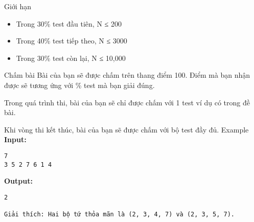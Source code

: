 Giới hạn
\begin{itemize}
	\item Trong 30\% test đầu tiên, N ≤ 200
	\item Trong 40\% test tiếp theo, N ≤ 3000
	\item Trong 30\% test còn lại, N ≤ 10,000
\end{itemize}
Chấm bài
Bài của bạn sẽ được chấm trên thang điểm 100. Điểm mà bạn nhận được sẽ tương ứng với \% test mà bạn giải đúng.

Trong quá trình thi, bài của bạn sẽ chỉ được chấm với 1 test ví dụ có trong đề bài.

Khi vòng thi kết thúc, bài của bạn sẽ được chấm với bộ test đầy đủ.
Example
\textbf{Input: }
\begin{verbatim}
7
3 5 2 7 6 1 4\end{verbatim}

\textbf{Output: }
\begin{verbatim}
2

Giải thích: Hai bộ tứ thỏa mãn là (2, 3, 4, 7) và (2, 3, 5, 7).\end{verbatim}